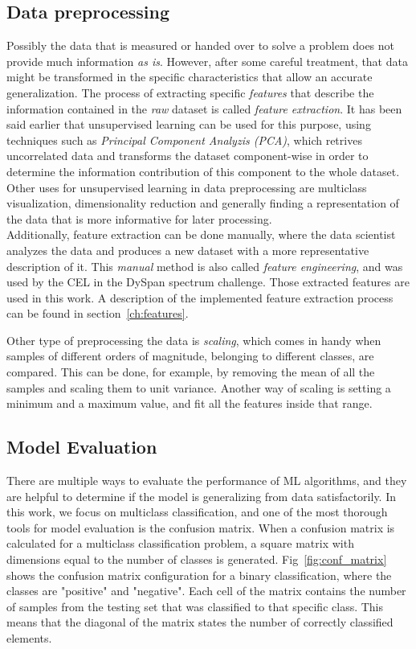 \subsection{Data preprocessing}
Possibly the data that is measured or handed over to solve a problem does not provide much information \emph{as is}. However, after some careful treatment, that data might be transformed in the specific characteristics that allow an accurate generalization. The process of extracting specific \emph{features} that describe the information contained in the \emph{raw} dataset is called \emph{feature extraction}. It has been said earlier that unsupervised learning can be used for this purpose, using techniques such as \emph{Principal Component Analyzis (PCA)}, which retrives uncorrelated data and transforms the dataset component-wise in order to determine the information contribution of this component to the whole dataset. Other uses for unsupervised learning in data preprocessing are multiclass visualization, dimensionality reduction and generally finding a representation of the data that is more informative for later processing.\\

Additionally, feature extraction can be done manually, where the data scientist analyzes the data and produces a new dataset with a more representative description of it. This \emph{manual} method is also called \emph{feature engineering}, and was used by the \ac{CEL} in the DySpan spectrum challenge. Those extracted features are used in this work. A description of the implemented feature extraction process can be found in section~\ref{ch:features}.

Other type of preprocessing the data is \emph{scaling}, which comes in handy when samples of different orders of magnitude, belonging to different classes, are compared. This can be done, for example, by removing the mean of all the samples and scaling them to unit variance. Another way of scaling is setting a minimum and a maximum value, and fit all the features inside that range.

\subsection{Model Evaluation}
There are multiple ways to evaluate the performance of \ac{ML} algorithms, and they are helpful to determine if the model is generalizing from data satisfactorily. In this work, we focus on multiclass classification, and one of the most thorough tools for model evaluation is the confusion matrix. When a confusion matrix is calculated for a multiclass classification problem, a square matrix with dimensions equal to the number of classes is generated. Fig~\ref{fig:conf_matrix} shows the confusion matrix configuration for a binary classification, where the classes are "positive" and "negative". Each cell of the matrix contains the number of samples from the testing set that was classified to that specific class. This means that the diagonal of the matrix states the number of correctly classified elements.

